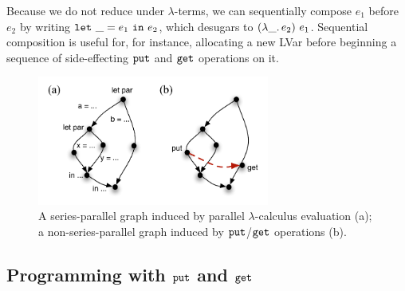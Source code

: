 Because we do not reduce under $\lambda$-terms,
we can sequentially compose $e_1$ before $e_2$ by writing $\mbox{\texttt{let}}~\_=e_1~\mbox{\texttt{in}}~e_2$,
which desugars to $(\lambda\_.\,e_2)~e_1$.
Sequential composition is useful for, for instance, allocating a new LVar before
beginning a sequence of  side-effecting $\mbox{\texttt{put}}$
and $\mbox{\texttt{get}}$ operations on it.

\begin{figure}[tb]
  \centering 
\includegraphics[width=3in,natwidth=366px,natheight=204px]{chapter2/figures/SeriesParallel.pdf} 
\caption{\footnotesize A series-parallel graph induced by parallel
    $\lambda$-calculus evaluation (a); a non-series-parallel
    graph induced by $\mbox{\texttt{put}}$/$\mbox{\texttt{get}}$ operations (b).}
  \label{f:series-parallel}
\end{figure}



\subsection{Programming with $\mbox{\texttt{put}}$ and $\mbox{\texttt{get}}$}\label{subsection:programming-with-put-and-get}


